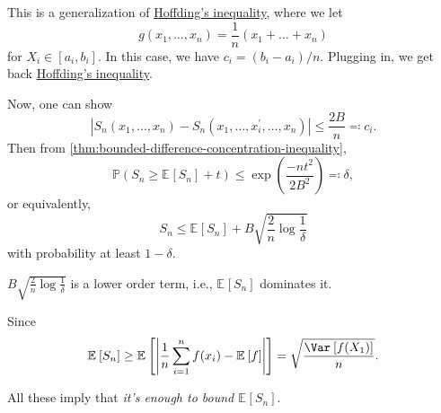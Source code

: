 \begin{remark}
	This is a generalization of \hyperref[thm:Hoeffding-inequality]{Hoffding's inequality}, where we let
	\[
		g(x_1, \dots , x_n) = \frac{1}{n}(x_1 + \dots + x_n)
	\]
	for \(X_i \in [a_i, b_i]\). In this case, we have \(c_i = (b_i - a_i) / n\). Plugging in, we get back \hyperref[thm:Hoeffding-inequality]{Hoffding's inequality}.
\end{remark}

Now, one can show
\[
	\left\vert S_n(x_1, \dots , x_n) - S_n(x_1, \dots , x_i^{\prime} , \dots , x_n) \right\vert \leq \frac{2B}{n} \eqqcolon c_i.
\]
Then from \autoref{thm:bounded-difference-concentration-inequality},
\[
	\mathbb{P} (S_n \geq \mathbb{E}_{}\left[S_n \right] + t) \leq \exp \left( \frac{-nt^2}{2B^2} \right) \eqqcolon \delta ,
\]
or equivalently,
\[
	S_n \leq \mathbb{E}_{}\left[S_n \right] + B \sqrt{\frac{2}{n}\log \frac{1}{\delta }}
\]
with probability at least \(1 - \delta \).

\begin{note}
	\(B \sqrt{\frac{2}{n} \log \frac{1}{\delta }} \) is a lower order term, i.e., \(\mathbb{E}_{}\left[S_n \right] \) dominates it.
\end{note}
\begin{explanation}
	Since
	\[
		\mathbb{E}_{}\left[S_n \right] \geq \mathbb{E}_{}\left[\left\vert \frac{1}{n} \sum_{i=1}^{n} f(x_i) - \mathbb{E}_{}\left[f \right] \right\vert \right] = \sqrt{\frac{\Var_{}\left[f(X_1) \right] }{n}} .
	\]
\end{explanation}

All these imply that \emph{it's enough to bound \(\mathbb{E}_{}\left[S_n \right] \)}.
